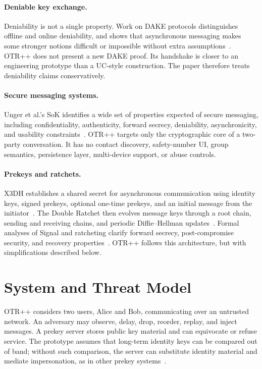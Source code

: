 \documentclass[11pt]{article}
\newcommand{\prot}{OTR++}
\begin{document}
\paragraph{Deniable key exchange.}
Deniability is not a single property. Work on DAKE protocols distinguishes offline and online deniability, and shows that asynchronous messaging makes some stronger notions difficult or impossible without extra assumptions~\cite{unger2015dake,unger2018improved}. \prot{} does not present a new DAKE proof. Its handshake is closer to an engineering prototype than a UC-style construction. The paper therefore treats deniability claims conservatively.

\paragraph{Secure messaging systems.}
Unger et al.'s SoK identifies a wide set of properties expected of secure messaging, including confidentiality, authenticity, forward secrecy, deniability, asynchronicity, and usability constraints~\cite{unger2015sok}. \prot{} targets only the cryptographic core of a two-party conversation. It has no contact discovery, safety-number UI, group semantics, persistence layer, multi-device support, or abuse controls.

\paragraph{Prekeys and ratchets.}
X3DH establishes a shared secret for asynchronous communication using identity keys, signed prekeys, optional one-time prekeys, and an initial message from the initiator~\cite{signal_x3dh}. The Double Ratchet then evolves message keys through a root chain, sending and receiving chains, and periodic Diffie--Hellman updates~\cite{signal_doubleratchet}. Formal analyses of Signal and ratcheting clarify forward secrecy, post-compromise security, and recovery properties~\cite{cohngordon2020signal,cohngordon2016pcs,alwen2019doubleratchet}. \prot{} follows this architecture, but with simplifications described below.

\section{System and Threat Model}

\prot{} considers two users, Alice and Bob, communicating over an untrusted network. An adversary may observe, delay, drop, reorder, replay, and inject messages. A prekey server stores public key material and can equivocate or refuse service. The prototype assumes that long-term identity keys can be compared out of band; without such comparison, the server can substitute identity material and mediate impersonation, as in other prekey systems~\cite{signal_x3dh}.
\end{document}
